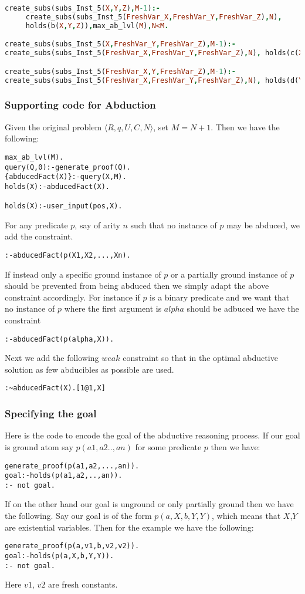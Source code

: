 \documentclass[sigconf]{acmart}
\begin{document}
\begin{lstlisting}[language=Prolog,frame=none]
create_subs(subs_Inst_5(X,Y,Z),M-1):-
     create_subs(subs_Inst_5(FreshVar_X,FreshVar_Y,FreshVar_Z),N), 
     holds(b(X,Y,Z)),max_ab_lvl(M),N<M.

create_subs(subs_Inst_5(X,FreshVar_Y,FreshVar_Z),M-1):-
create_subs(subs_Inst_5(FreshVar_X,FreshVar_Y,FreshVar_Z),N), holds(c(X)),max_ab_lvl(M),N<M.

create_subs(subs_Inst_5(FreshVar_X,Y,FreshVar_Z),M-1):-
create_subs(subs_Inst_5(FreshVar_X,FreshVar_Y,FreshVar_Z),N), holds(d(Y)),max_ab_lvl(M),N<M.
\end{lstlisting}

\subsubsection{Supporting code for Abduction} 
Given the original problem $\langle R,q,U,C,N\rangle$, set $M=N+1$. Then we have the following: 
\begin{verbatim}
max_ab_lvl(M).
query(Q,0):-generate_proof(Q).
{abducedFact(X)}:-query(X,M).
holds(X):-abducedFact(X).

holds(X):-user_input(pos,X).
\end{verbatim}
For any predicate $p$, say of arity $n$ such that no instance of $p$ may be abduced, we add the constraint.
\begin{verbatim} 
:-abducedFact(p(X1,X2,...,Xn).
\end{verbatim}
If instead only a specific ground instance of $p$ or a partially ground instance of $p$ should be prevented from being abduced then we simply adapt the above constraint accordingly. For instance if $p$ is a binary predicate and we want that no instance of $p$ where the first argument is $alpha$ should be adbuced we have the constraint
\begin{verbatim} 
:-abducedFact(p(alpha,X)).
\end{verbatim}
Next we add the following $weak$ constraint so that in the optimal abductive solution as few abducibles as possible are used.
\begin{verbatim} 
:~abducedFact(X).[1@1,X]
\end{verbatim}
\subsubsection{Specifying the goal}
Here is the code to encode the goal of the abductive reasoning process. If our goal is ground atom say $p(a1,a2..,an)$ for some predicate $p$ then we have:
\begin{verbatim}
generate_proof(p(a1,a2,...,an)).
goal:-holds(p(a1,a2,..,an)).
:- not goal.
\end{verbatim}
If on the other hand our goal is unground or only partially ground then we have the following. Say our goal is of the form $p(a,X,b,Y,Y)$, which means that $X$,$Y$ are existential variables. Then for the example we have the following:
\begin{verbatim}
generate_proof(p(a,v1,b,v2,v2)).
goal:-holds(p(a,X,b,Y,Y)).
:- not goal.
\end{verbatim}
Here $v1$, $v2$ are fresh constants.
\end{document}
